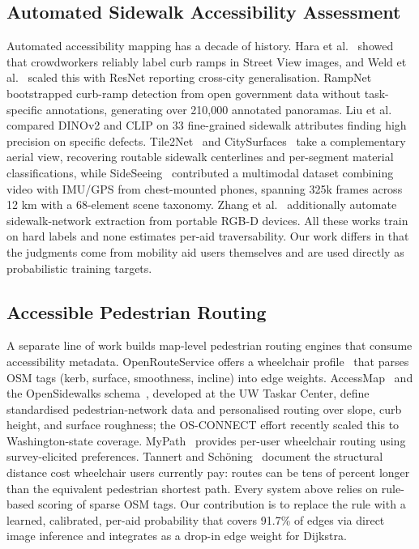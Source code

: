 \documentclass[conference]{IEEEtran}
\begin{document}
\subsection{Automated Sidewalk Accessibility Assessment}
Automated accessibility mapping has a decade of history. Hara et al.~\cite{10.1145/2470654.2470744,10.1145/2642918.2647403} showed that crowdworkers reliably label curb ramps in Street View images, and Weld et al.~\cite{10.1145/3308561.3353798} scaled this with ResNet reporting cross-city generalisation. RampNet~\cite{o'meara2025rampnet} bootstrapped curb-ramp detection from open government data without task-specific annotations, generating over 210{,}000 annotated panoramas. Liu et al.~\cite{10.1145/3663548.3688531} compared DINOv2 and CLIP on 33 fine-grained sidewalk attributes finding high precision on specific defects. Tile2Net~\cite{hosseini2023tile2net} and CitySurfaces~\cite{hosseini2022citysurfaces} take a complementary aerial view, recovering routable sidewalk centerlines and per-segment material classifications, while SideSeeing~\cite{damaceno2024sideseeing} contributed a multimodal dataset combining video with IMU/GPS from chest-mounted phones, spanning 325k frames across 12 km with a 68-element scene taxonomy. Zhang et al.~\cite{10.1145/3441852.3476560} additionally automate sidewalk-network extraction from portable RGB-D devices. All these works train on hard labels and none estimates per-aid traversability. Our work differs in that the judgments come from mobility aid users themselves and are used directly as probabilistic training targets.

\subsection{Accessible Pedestrian Routing}
A separate line of work builds map-level pedestrian routing engines that consume accessibility metadata. OpenRouteService offers a wheelchair profile~\cite{openrouteservice2026wheelchair} that parses OSM tags (kerb, surface, smoothness, incline) into edge weights. AccessMap~\cite{bolten2017accessmap} and the OpenSidewalks schema~\cite{bolten2019opensidewalks}, developed at the UW Taskar Center, define standardised pedestrian-network data and personalised routing over slope, curb height, and surface roughness; the OS-CONNECT effort recently scaled this to Washington-state coverage. MyPath~\cite{saha2022mypath} provides per-user wheelchair routing using survey-elicited preferences. Tannert and Sch{\"o}ning~\cite{tannert2018wheelchair} document the structural distance cost wheelchair users currently pay: routes can be tens of percent longer than the equivalent pedestrian shortest path. Every system above relies on rule-based scoring of sparse OSM tags. Our contribution is to replace the rule with a learned, calibrated, per-aid probability that covers 91.7\% of edges via direct image inference and integrates as a drop-in edge weight for Dijkstra.
\end{document}
